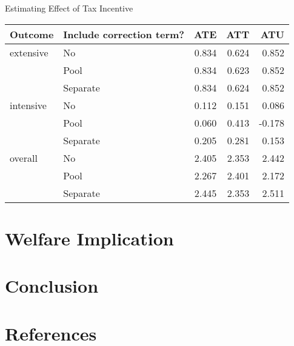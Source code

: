\documentclass[
  ignorenonframetext,
  aspectratio=169,
]{beamer}
\begin{document}
\begin{frame}{Estimating Effect of Tax Incentive}
\protect\hypertarget{estimating-effect-of-tax-incentive}{}
\begin{table}
\centering
\fontsize{7}{9}\selectfont
\begin{tabular}[t]{llrrr}
\toprule
Outcome & Include correction term? & ATE & ATT & ATU\\
\midrule
extensive & No & 0.834 & 0.624 & 0.852\\
 & Pool & 0.834 & 0.623 & 0.852\\
 & Separate & 0.834 & 0.624 & 0.852\\
intensive & No & 0.112 & 0.151 & 0.086\\
 & Pool & 0.060 & 0.413 & -0.178\\
 & Separate & 0.205 & 0.281 & 0.153\\
overall & No & 2.405 & 2.353 & 2.442\\
 & Pool & 2.267 & 2.401 & 2.172\\
 & Separate & 2.445 & 2.353 & 2.511\\
\bottomrule
\end{tabular}
\end{table}
\end{frame}

\hypertarget{welfare-implication}{%
\section{Welfare Implication}\label{welfare-implication}}

\hypertarget{conclusion}{%
\section{Conclusion}\label{conclusion}}

\hypertarget{references}{%
\section*{References}\label{references}}
\end{document}
